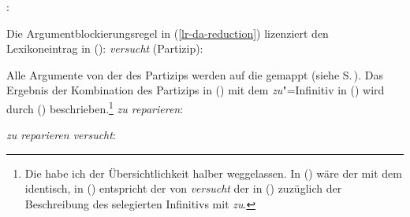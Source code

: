 {\eas
\label{le-versuchen-da}%
:\\
\zs

\noindent
Die Argumentblockierungsregel in (\ref{lr-da-reduction}) lizenziert den Lexikoneintrag in ():
\eas
\label{le-versucht-hm}%
\emph{versucht} (Partizip):\\
\zs

\noindent
Alle Argumente von der \argst des Partizips werden auf die \compsl gemappt (siehe S.\,\pageref{bsp-subjekt-im-vf-passiv}).
Das Ergebnis der Kombination des Partizips in () mit dem \emph{zu}"=Infinitiv in
() wird durch () beschrieben.\footnote{%
Die \argstwe habe ich der Übersichtlichkeit halber weggelassen. In () wäre der \argstw mit
dem \compsw identisch, in () entspricht der \argstw von \emph{versucht} der \compsl in
() zuzüglich der Beschreibung des selegierten Infinitivs mit \emph{zu}.
}
\eas
\emph{zu reparieren}:\\
\zs

\eas
\label{ex-zu-reparieren-versucht}%
\emph{zu reparieren versucht}:\\
\zs

}
